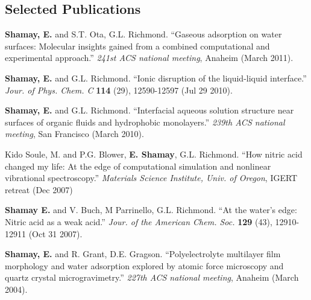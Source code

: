 \documentclass[margin,line]{res}
\begin{document}
\begin{resume}
\section{\sc Selected Publications}


\textbf{Shamay, E.} and S.T. Ota, G.L. Richmond. ``Gaseous adsorption on water surfaces: Molecular insights gained from a combined computational and experimental approach.'' \emph{241st ACS national meeting}, Anaheim (March 2011).

\textbf{Shamay, E.} and G.L. Richmond. ``Ionic disruption of the liquid-liquid interface.'' \emph{Jour. of Phys. Chem. C} \textbf{114} (29), 12590-12597 (Jul 29 2010).

\textbf{Shamay, E.} and G.L. Richmond. ``Interfacial aqueous solution structure near surfaces of organic fluids and hydrophobic monolayers.'' \emph{239th ACS national meeting}, San Francisco (March 2010).

Kido Soule, M. and P.G. Blower, \textbf{E. Shamay}, G.L. Richmond. ``How nitric acid changed my life: At the edge of computational simulation and nonlinear vibrational spectroscopy.'' \emph{Materials Science Institute, Univ. of Oregon}, IGERT retreat (Dec 2007)

\textbf{Shamay E.} and V. Buch, M Parrinello, G.L. Richmond. ``At the water's edge: Nitric acid as a weak acid.'' \emph{Jour. of the American Chem. Soc.} \textbf{129} (43), 12910-12911 (Oct 31 2007).

\textbf{Shamay, E.} and R. Grant, D.E. Gragson. ``Polyelectrolyte multilayer film morphology and water adsorption explored by atomic force microscopy and quartz crystal microgravimetry.'' \emph{227th ACS national meeting}, Anaheim (March 2004).


%
%
%
%


\end{resume}
\end{document}
